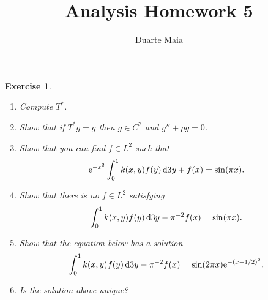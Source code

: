 \documentclass{article}
\title{Analysis Homework 5}
\author{Duarte Maia}
\newtheorem{ex}{Exercise}
\theoremstyle{nonumberplain}
\newcommand{\e}{\mathrm{e}}
\begin{document}
\maketitle

\begin{ex}
\leavevmode
\begin{enumerate}
\item Compute $T^*$.
\item Show that if $T^* g = g$ then $g \in C^2$ and $g'' + \rho g = 0$.
\item Show that you can find $f \in L^2$ such that
\begin{equation}
\e^{-x^2} \int_0^1 k(x,y) f(y) \dl3 y + f(x) = \sin(\pi x).
\end{equation}
\item Show that there is no $f \in L^2$ satisfying
\begin{equation}
\int_0^1 k(x,y) f(y) \dl3 y - \pi^{-2} f(x) = \sin(\pi x).
\end{equation}
\item Show that the equation below has a solution
\begin{equation}
\int_0^1 k(x,y) f(y) \dl3 y - \pi^{-2} f(x) = \sin(2 \pi x) \e^{-(x-1/2)^2}.
\end{equation}
\item Is the solution above unique?
\end{enumerate}
\end{ex}
\end{document}
